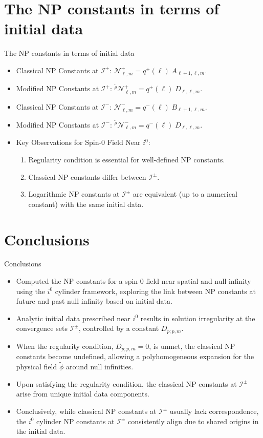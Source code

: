 \documentclass{beamer}
\theoremstyle{remark}
\theoremstyle{plain}
\theoremstyle{plain}
\begin{document}
\section{The NP constants in terms of initial data}
\begin{frame}{The NP constants in terms of initial data}
  \begin{itemize}
    \item Classical NP Constants at $\mathscr{I}^{+}$: $\mathcal{N}^{+}_{\ell,m} = q^{+}(\ell) \;A_{\ell+1,\ell,m}$.
    \item Modified NP Constants at $\mathscr{I}^{+}$: ${}^{\tilde{\rho}}\mathcal{N}^{+}_{\ell,m} = q^{+}(\ell) \;D_{\ell,\ell,m}$.
    \item Classical NP Constants at $\mathscr{I}^{-}$: $\mathcal{N}^{-}_{\ell,m} = q^{-}(\ell) \; B_{\ell+1,\ell,m}$.
    \item Modified NP Constants at $\mathscr{I}^{-}$: ${}^{\tilde{\rho}}\mathcal{N}^{-}_{\ell,m} = q^{-}(\ell) \;D_{\ell,\ell,m}$.
    \item Key Observations for Spin-0 Field Near $i^0$:
    \begin{enumerate}
      \item Regularity condition is essential for well-defined NP constants.
      \item Classical NP constants differ between $\mathscr{I}^{\pm}$.
      \item Logarithmic NP constants at $\mathscr{I}^{\pm}$ are equivalent (up to a numerical constant) with the same initial data.
    \end{enumerate}
  \end{itemize}
\end{frame}
\section{Conclusions}
\begin{frame}{Conclusions}
  \begin{itemize}
    \item Computed the NP constants for a spin-0 field near spatial and null infinity using the \(i^0\) cylinder framework, exploring the link between NP constants at future and past null infinity based on initial data. 
    \item Analytic initial data prescribed near \(i^0\) results in solution irregularity at the convergence sets \(\mathcal{I}^{\pm}\), controlled by a constant \(D_{p;p,m}\). 
    \item When the regularity condition, \(D_{p;p,m} = 0\), is unmet, the classical NP constants become undefined, allowing a polyhomogeneous expansion for the physical field \(\tilde{\phi}\) around null infinities. 
    \item Upon satisfying the regularity condition, the classical NP constants at \(\mathscr{I}^{\pm}\) arise from unique initial data components. 
    \item Conclusively, while classical NP constants at \(\mathscr{I}^{\pm}\) usually lack correspondence, the \(i^0\) cylinder NP constants at \(\mathscr{I}^{\pm}\) consistently align due to shared origins in the initial data.
  \end{itemize}
\end{frame}
\end{document}
